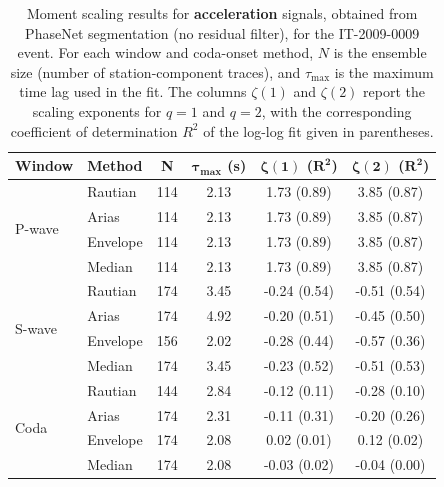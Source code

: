 \begin{table}[H]
\centering
\small
\begin{tabular}{llcccc}
\toprule
\textbf{Window} & \textbf{Method} & \textbf{N} & $\bm{\tau_{\max}}$ \textbf{(s)} & $\bm{\zeta(1)}$ \textbf{(}$\bm{R^2}$\textbf{)} & $\bm{\zeta(2)}$ \textbf{(}$\bm{R^2}$\textbf{)} \\
\midrule
\multirow{4}{*}{P-wave}
& Rautian & 114 & 2.13 & 1.73 (0.89) & 3.85 (0.87) \\
& Arias & 114 & 2.13 & 1.73 (0.89) & 3.85 (0.87) \\
& Envelope & 114 & 2.13 & 1.73 (0.89) & 3.85 (0.87) \\
& Median & 114 & 2.13 & 1.73 (0.89) & 3.85 (0.87) \\
\midrule
\multirow{4}{*}{S-wave}
& Rautian & 174 & 3.45 & -0.24 (0.54) & -0.51 (0.54) \\
& Arias & 174 & 4.92 & -0.20 (0.51) & -0.45 (0.50) \\
& Envelope & 156 & 2.02 & -0.28 (0.44) & -0.57 (0.36) \\
& Median & 174 & 3.45 & -0.23 (0.52) & -0.51 (0.53) \\
\midrule
\multirow{4}{*}{Coda}
& Rautian & 144 & 2.84 & -0.12 (0.11) & -0.28 (0.10) \\
& Arias & 174 & 2.31 & -0.11 (0.31) & -0.20 (0.26) \\
& Envelope & 174 & 2.08 & 0.02 (0.01) & 0.12 (0.02) \\
& Median & 174 & 2.08 & -0.03 (0.02) & -0.04 (0.00) \\
\bottomrule
\end{tabular}
\caption{Moment scaling results for \textbf{acceleration} signals, obtained from PhaseNet segmentation (no residual filter), for the IT-2009-0009 event. For each window and coda-onset method, $N$ is the ensemble size (number of station-component traces), and $\tau_{\max}$ is the maximum time lag used in the fit. The columns $\zeta(1)$ and $\zeta(2)$ report the scaling exponents for $q=1$ and $q=2$, with the corresponding coefficient of determination $R^2$ of the log-log fit given in parentheses.}
\label{tab:phasenet_scaling_acc_nothresh_laquila}
\end{table}